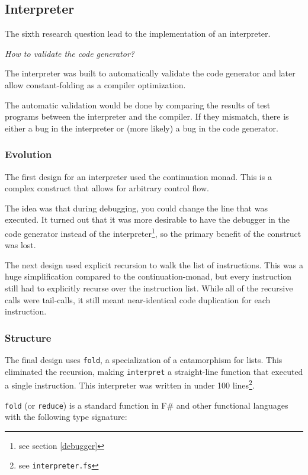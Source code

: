 \subsection{Interpreter}
The sixth research question lead to the implementation of an interpreter.

\textit{How to validate the code generator?}

The interpreter was built to automatically validate the code generator and later allow constant-folding as a compiler optimization.

The automatic validation would be done by comparing the results of test programs between the interpreter and the compiler.
If they mismatch, there is either a bug in the interpreter or (more likely) a bug in the code generator.

\subsubsection{Evolution}
The first design for an interpreter used the continuation monad.
This is a complex construct that allows for arbitrary control flow.

The idea was that during debugging, you could change the line that was executed.
It turned out that it was more desirable to have the debugger in the code generator instead of the interpreter\footnote{see section \ref{debugger}}, so the primary benefit of the construct was lost.

The next design used explicit recursion to walk the list of instructions.
This was a huge simplification compared to the continuation-monad, but every instruction still had to explicitly recurse over the instruction list.
While all of the recursive calls were tail-calls\cite{tailcalls}, it still meant near-identical code duplication for each instruction.

\subsubsection{Structure}
The final design uses \verb|fold|, a specialization of a catamorphism for lists\cite{catamorphism}.
This eliminated the recursion, making \verb|interpret| a straight-line function that executed a single instruction.
This interpreter was written in under 100 lines\footnote{see \texttt{interpreter.fs}}.

\verb|fold| (or \verb|reduce|) is a standard function in F\# and other functional languages with the following type signature:

